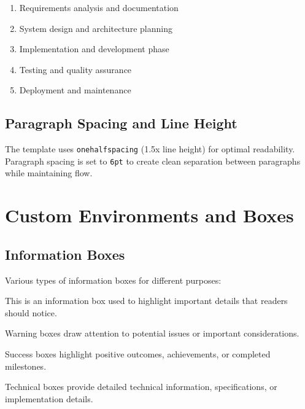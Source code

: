 \documentclass{internshipreport}
\begin{document}
\begin{enumerate}
\item Requirements analysis and documentation
\item System design and architecture planning
\item Implementation and development phase
\item Testing and quality assurance
\item Deployment and maintenance
\end{enumerate}

\section{Paragraph Spacing and Line Height}

The template uses \texttt{onehalfspacing} (1.5x line height) for optimal readability. Paragraph spacing is set to \texttt{6pt} to create clean separation between paragraphs while maintaining flow.

\chapter{Custom Environments and Boxes}
\label{chap:environments}

\section{Information Boxes}

Various types of information boxes for different purposes:

\begin{infobox}
This is an information box used to highlight important details that readers should notice.
\end{infobox}

\begin{warningbox}
Warning boxes draw attention to potential issues or important considerations.
\end{warningbox}

\begin{successbox}
Success boxes highlight positive outcomes, achievements, or completed milestones.
\end{successbox}

\begin{technicalbox}
Technical boxes provide detailed technical information, specifications, or implementation details.
\end{technicalbox}
\end{document}
